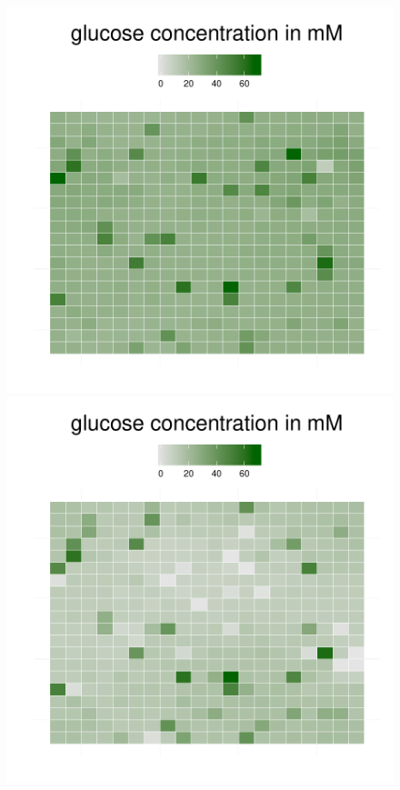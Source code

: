 \begin{figure}[h!]
{\begin{minipage}[t]{0.3\textwidth}
  \end{minipage}
  \begin{minipage}[t]{0.3\textwidth}
    \includegraphics[width=\textwidth]{../results/barkeri_ecoli_20x20_seed4612_glc100a.pdf}
  \end{minipage}
  \begin{minipage}[t]{0.3\textwidth}
    \includegraphics[width=\textwidth]{../results/barkeri_ecoli_20x20_seed4612_glc130.pdf}

\end{minipage}}
\end{figure}
